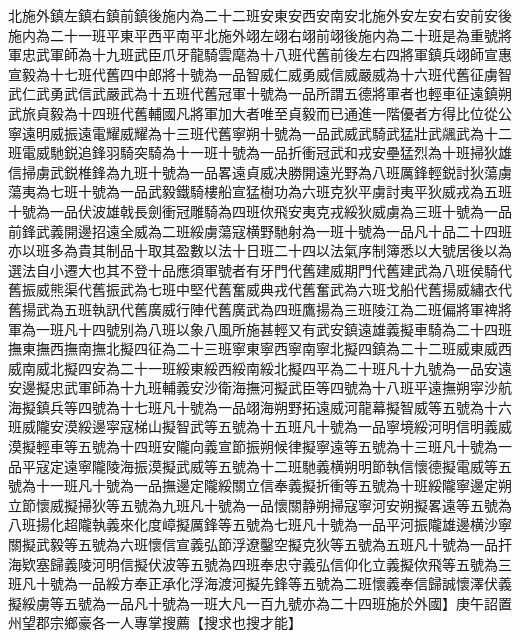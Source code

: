 北施外鎮左鎮右鎮前鎮後施内為二十二班安東安西安南安北施外安左安右安前安後施内為二十一班平東平西平南平北施外翊左翊右翊前翊後施内為二十班是為重號將軍忠武軍師為十九班武臣爪牙龍騎雲麾為十八班代舊前後左右四將軍鎮兵翊師宣惠宣毅為十七班代舊四中郎將十號為一品智威仁威勇威信威嚴威為十六班代舊征虜智武仁武勇武信武嚴武為十五班代舊冠軍十號為一品所謂五德將軍者也輕車征遠鎮朔武旅貞毅為十四班代舊輔國凡將軍加大者唯至貞毅而已通進一階優者方得比位從公寧遠明威振遠電耀威耀為十三班代舊寧朔十號為一品武威武騎武猛壯武飊武為十二班電威馳鋭追鋒羽騎突騎為十一班十號為一品折衝冠武和戎安壘猛烈為十班掃狄雄信掃虜武鋭椎鋒為九班十號為一品畧遠貞威决勝開遠光野為八班厲鋒輕鋭討狄蕩虜蕩夷為七班十號為一品武毅鐵騎樓船宣猛樹功為六班克狄平虜討夷平狄威戎為五班十號為一品伏波雄戟長劍衝冠雕騎為四班佽飛安夷克戎綏狄威虜為三班十號為一品前鋒武義開邊招遠全威為二班綏虜蕩寇横野馳射為一班十號為一品凡十品二十四班亦以班多為貴其制品十取其盈數以法十日班二十四以法氣序制簿悉以大號居後以為選法自小遷大也其不登十品應須軍號者有牙門代舊建威期門代舊建武為八班侯騎代舊振威熊渠代舊振武為七班中堅代舊奮威典戎代舊奮武為六班戈船代舊揚威繡衣代舊揚武為五班執訊代舊廣威行陣代舊廣武為四班鷹揚為三班陵江為二班偏將軍禆將軍為一班凡十四號别為八班以象八風所施甚輕又有武安鎮遠雄義擬車騎為二十四班撫東撫西撫南撫北擬四征為二十三班寧東寧西寧南寧北擬四鎮為二十二班威東威西威南威北擬四安為二十一班綏東綏西綏南綏北擬四平為二十班凡十九號為一品安遠安邊擬忠武軍師為十九班輔義安沙衛海撫河擬武臣等四號為十八班平遠撫朔寜沙航海擬鎮兵等四號為十七班凡十號為一品翊海朔野拓遠威河龍幕擬智威等五號為十六班威隴安漠綏邊寜寇梯山擬智武等五號為十五班凡十號為一品寧境綏河明信明義威漠擬輕車等五號為十四班安隴向義宣節振朔候律擬寧遠等五號為十三班凡十號為一品平寇定遠寧隴陵海振漠擬武威等五號為十二班馳義横朔明節執信懷德擬電威等五號為十一班凡十號為一品撫邊定隴綏關立信奉義擬折衝等五號為十班綏隴寧邊定朔立節懷威擬掃狄等五號為九班凡十號為一品懷關静朔掃寇寧河安朔擬畧遠等五號為八班揚化超隴執義來化度嶂擬厲鋒等五號為七班凡十號為一品平河振隴雄邊横沙寧關擬武毅等五號為六班懷信宣義弘節浮遼鑿空擬克狄等五號為五班凡十號為一品扞海欵塞歸義陵河明信擬伏波等五號為四班奉忠守義弘信仰化立義擬佽飛等五號為三班凡十號為一品綏方奉正承化浮海渡河擬先鋒等五號為二班懷義奉信歸誠懷澤伏義擬綏虜等五號為一品凡十號為一班大凡一百九號亦為二十四班施於外國】庚午詔置州望郡宗鄉豪各一人專掌搜薦【搜求也搜才能】

